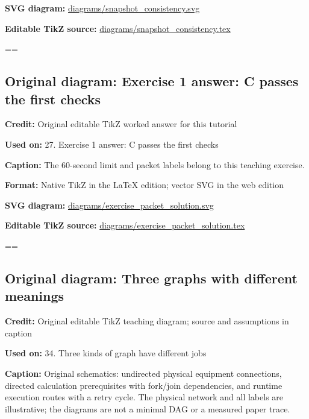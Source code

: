 \documentclass[10pt,letterpaper]{article}
\begin{document}
\textbf{SVG diagram:} \href{diagrams/snapshot_consistency.svg}{\small\ttfamily diagrams/\allowbreak{}snapshot\_\allowbreak{}consistency.\allowbreak{}svg}\par
\textbf{Editable TikZ source:} \href{diagrams/snapshot_consistency.tex}{\small\ttfamily diagrams/\allowbreak{}snapshot\_\allowbreak{}consistency.\allowbreak{}tex}\par
\egroup\par\noindent\box\readingEntry\par\medskip
\setbox\readingEntry=\vbox\bgroup\hsize=\linewidth\subsection*{Original diagram: Exercise 1 answer: C passes the first checks}
\textbf{Credit:} Original editable TikZ worked answer for this tutorial\par
\textbf{Used on:} 27. Exercise 1 answer: C passes the first checks\par
\textbf{Caption:} The 60-second limit and packet labels belong to this teaching exercise.\par
\textbf{Format:} Native TikZ in the LaTeX edition; vector SVG in the web edition\par
\textbf{SVG diagram:} \href{diagrams/exercise_packet_solution.svg}{\small\ttfamily diagrams/\allowbreak{}exercise\_\allowbreak{}packet\_\allowbreak{}solution.\allowbreak{}svg}\par
\textbf{Editable TikZ source:} \href{diagrams/exercise_packet_solution.tex}{\small\ttfamily diagrams/\allowbreak{}exercise\_\allowbreak{}packet\_\allowbreak{}solution.\allowbreak{}tex}\par
\egroup\par\noindent\box\readingEntry\par\medskip
\setbox\readingEntry=\vbox\bgroup\hsize=\linewidth\subsection*{Original diagram: Three graphs with different meanings}
\textbf{Credit:} Original editable TikZ teaching diagram; source and assumptions in caption\par
\textbf{Used on:} 34. Three kinds of graph have different jobs\par
\textbf{Caption:} Original schematics: undirected physical equipment connections, directed calculation prerequisites with fork/join dependencies, and runtime execution routes with a retry cycle. The physical network and all labels are illustrative; the diagrams are not a minimal DAG or a measured paper trace.\par
\end{document}
